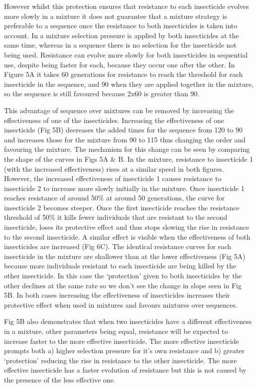 \documentclass[11pt,]{article}
\begin{document}
However whilst this protection ensures that resistance to each
insecticide evolves more slowly in a mixture it does not guarantee that
a mixture strategy is preferable to a sequence once the resistance to
both insecticides is taken into account. In a mixture selection pressure
is applied by both insecticides at the same time, whereas in a sequence
there is no selection for the insecticide not being used. Resistance can
evolve more slowly for both insecticides in sequential use, despite
being faster for each, because they occur one after the other. In Figure
5A it takes 60 generations for resistance to reach the threshold for
each insecticide in the sequence, and 90 when they are applied together
in the mixture, so the sequence is still favoured because 2x60 is
greater than 90.

This advantage of sequence over mixtures can be removed by increasing
the effectiveness of one of the insecticides. Increasing the
effectiveness of one insecticide (Fig 5B) decreases the added times for
the sequence from 120 to 90 and increases those for the mixture from 90
to 115 thus changing the order and favouring the mixture. The mechanism
for this change can be seen by comparing the shape of the curves in Figs
5A \& B. In the mixture, resistance to insecticide 1 (with the increased
effectiveness) rises at a similar speed in both figures. However, the
increased effectiveness of insecticide 1 causes resistance to
insecticide 2 to increase more slowly initially in the mixture. Once
insecticide 1 reaches resistance of around 50\% at around 50
generations, the curve for insecticide 2 becomes steeper. Once the first
insecticide reaches the resistance threshold of 50\% it kills fewer
individuals that are resistant to the second insecticide, loses its
protective effect and thus stops slowing the rise in resistance to the
second insecticide. A similar effect is visible when the effectiveness
of both insecticides are increased (Fig 6C). The identical resistance
curves for each insecticide in the mixture are shallower than at the
lower effectiveness (Fig 5A) because more individuals resistant to each
insecticide are being killed by the other insecticide. In this case the
`protection' given to both insecticides by the other declines at the
same rate so we don't see the change in slope seen in Fig 5B. In both
cases increasing the effectiveness of insecticides increases their
protective effect when used in mixtures and favours mixtures over
sequences.

Fig 5B also demonstrates that when two insecticides have a different
effectiveness in a mixture, other parameters being equal, resistance
will be expected to increase faster to the more effective insecticide.
The more effective insecticide prompts both a) higher selection pressure
for it's own resistance and b) greater `protection' reducing the rise in
resistance to the other insecticide. The more effective insecticide has
a faster evolution of resistance but this is not caused by the presence
of the less effective one.
\end{document}
